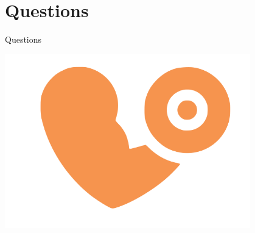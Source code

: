 \documentclass[12pt]{beamer}
\begin{document}
\section{Questions}
\begin{frame}{Questions}

\begin{center}
\includegraphics[width=0.8\textwidth]{gymodo_logo}
\end{center}


\end{frame}
\end{document}
